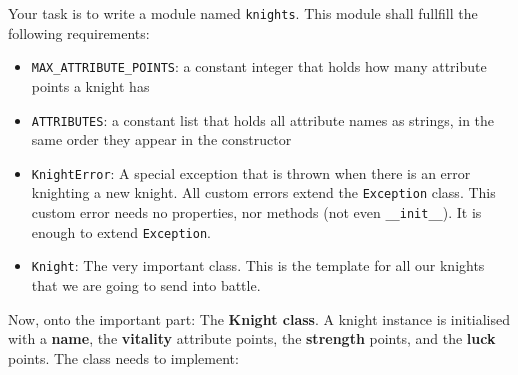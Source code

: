 \noindent Your task is to write a module named \texttt{knights}. This module shall fullfill
the following requirements:
\begin{itemize}
	\item \texttt{MAX\_ATTRIBUTE\_POINTS}: a constant integer that holds how many
		attribute points a knight has
	\item \texttt{ATTRIBUTES}: a constant list that holds all attribute names
		as strings, in the same order they appear in the constructor
	\item \texttt{KnightError}: A special exception that is thrown when there is
		an error knighting a new knight. All custom errors extend the
		\texttt{Exception} class. This custom error needs no properties, nor
		methods (not even \texttt{\_\_init\_\_}). It is enough to extend \texttt{Exception}.
	\item \texttt{Knight}: The very important class. This is the template for all our
		knights that we are going to send into battle.
\end{itemize}
Now, onto the important part: The \textbf{Knight class}. A knight instance is initialised with
a \textbf{name}, the \textbf{vitality} attribute points, the \textbf{strength} points, and the
\textbf{luck} points. The class needs to implement:
